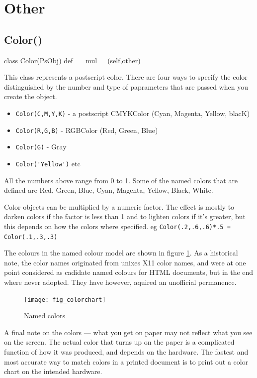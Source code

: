 \documentclass[a4paper]{book}
\begin{document}
\section{Other}

\subsection{Color()}
\label{sec:color}
\begin{python}
class Color(PsObj)
    def __mul__(self,other)
\end{python}

This class represents a postscript color. There are four ways to specify
the color distinguished by the number and type of paprameters that
are passed when you create the object.

\begin{itemize}
\item \Verb|Color(C,M,Y,K)| - a postscript CMYKColor (Cyan, Magenta, Yellow, blacK) 
\item \Verb|Color(R,G,B)| - RGBColor (Red, Green, Blue)
\item \Verb|Color(G)| - Gray
\item \Verb|Color('Yellow')| etc
\end{itemize}

All the numbers above range from 0 to 1. Some of the named colors that
are defined are Red, Green, Blue, Cyan, Magenta, Yellow, Black, White.

Color objects can be multiplied by a numeric factor.  The effect is
mostly to darken colors if the factor is less than 1 and to lighten
colors if it's greater, but this depends on how the colors where
specified.  eg \Verb|Color(.2,.6,.6)*.5 = Color(.1,.3,.3)|

The colours in the named colour model are shown in figure
\ref{fig:colourchart}. As a historical note, the color names originated 
from unixes X11 color names, and were at one point considered as 
cadidate named colours for HTML documents, but in the end where
never adopted. They have however, aquired an unofficial permanence.
\begin{figure}[h]
\centerline{
  \texttt{[image: fig\_colorchart]}
}
\caption{Named colors}
\label{fig:colourchart}
\end{figure}

A final note on the colors --- what you get on paper may not reflect
what you see on the screen. The actual color that turns up on the
paper is a complicated function of how it was produced, and depends on
the hardware. The fastest and most accurate way to match colors in a
printed document is to print out a color chart on the intended
hardware.
\end{document}
